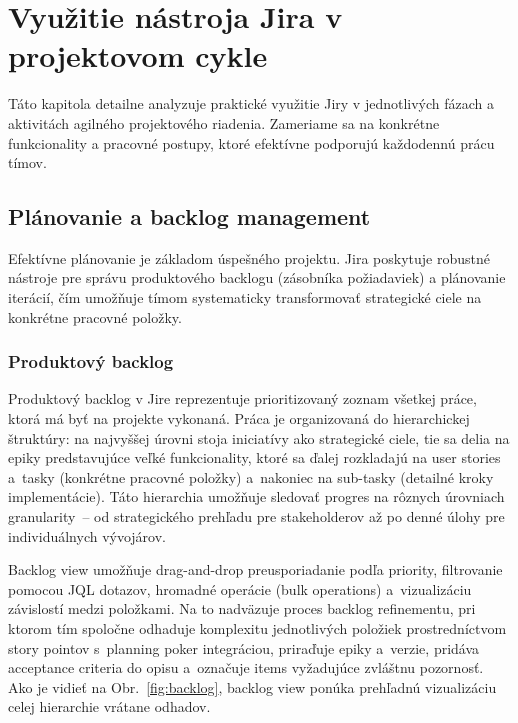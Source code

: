 
\chapter{Využitie nástroja Jira v projektovom cykle}\label{ch:vyuzitie}

Táto kapitola detailne analyzuje praktické využitie Jiry v jednotlivých fázach a aktivitách agilného projektového riadenia. Zameriame sa na konkrétne funkcionality a pracovné postupy, ktoré efektívne podporujú každodennú prácu tímov.

\section{Plánovanie a backlog management}

Efektívne plánovanie je základom úspešného projektu. Jira poskytuje robustné nástroje pre správu produktového backlogu (zásobníka požiadaviek) a plánovanie iterácií, čím umožňuje tímom systematicky transformovať strategické ciele na konkrétne pracovné položky.

\subsection{Produktový backlog}

Produktový backlog v Jire reprezentuje prioritizovaný zoznam všetkej práce, ktorá má byť na projekte vykonaná. Práca je organizovaná do hierarchickej štruktúry: na najvyššej úrovni stoja iniciatívy ako strategické ciele, tie sa delia na epiky predstavujúce veľké funkcionality, ktoré sa ďalej rozkladajú na user stories a~tasky (konkrétne pracovné položky) a~nakoniec na sub-tasky (detailné kroky implementácie). Táto hierarchia umožňuje sledovať progres na rôznych úrovniach granularity~-- od strategického prehľadu pre stakeholderov až po denné úlohy pre individuálnych vývojárov.

Backlog view umožňuje drag-and-drop preusporiadanie podľa priority, filtrovanie pomocou JQL dotazov, hromadné operácie (bulk operations) a~vizualizáciu závislostí medzi položkami. Na to nadväzuje proces backlog refinementu, pri ktorom tím spoločne odhaduje komplexitu jednotlivých položiek prostredníctvom story pointov s~planning poker integráciou, priraďuje epiky a~verzie, pridáva acceptance criteria do opisu a~označuje items vyžadujúce zvláštnu pozornosť. Ako je vidieť na Obr.~\ref{fig:backlog}, backlog view ponúka prehľadnú vizualizáciu celej hierarchie vrátane odhadov.

